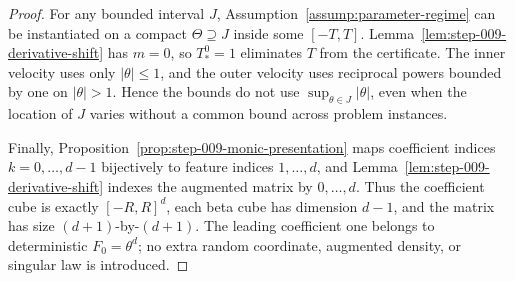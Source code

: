 \begin{proof}
For any bounded interval \(J\), Assumption~\ref{assump:parameter-regime} can be instantiated on a compact \(\Theta\supseteq J\) inside some \([-T,T]\). Lemma~\ref{lem:step-009-derivative-shift} has \(m=0\), so \(T_*^0=1\) eliminates \(T\) from the certificate. The inner velocity uses only \(\lvert\theta\rvert\leq1\), and the outer velocity uses reciprocal powers bounded by one on \(\lvert\theta\rvert>1\). Hence the bounds do not use \(\sup_{\theta\in J}\lvert\theta\rvert\), even when the location of \(J\) varies without a common bound across problem instances.

Finally, Proposition~\ref{prop:step-009-monic-presentation} maps coefficient indices \(k=0,\ldots,d-1\) bijectively to feature indices \(1,\ldots,d\), and Lemma~\ref{lem:step-009-derivative-shift} indexes the augmented matrix by \(0,\ldots,d\). Thus the coefficient cube is exactly \([-R,R]^d\), each beta cube has dimension \(d-1\), and the matrix has size \((d+1)\)-by-\((d+1)\). The leading coefficient one belongs to deterministic \(F_0=\theta^d\); no extra random coordinate, augmented density, or singular law is introduced.

\end{proof}


